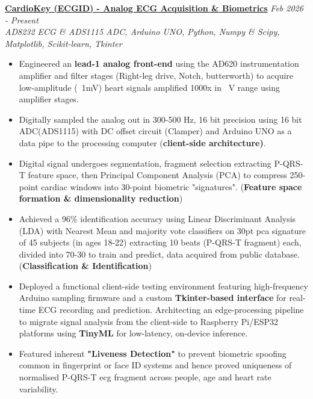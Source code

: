 \documentclass[a4paper]{article}
\begin{document}
\href{https://github.com/aaromalonline/cardiokey}{\textbf{CardioKey (ECGID) - Analog ECG Acquisition \& Biometrics}} \hfill \textit{Feb 2026 - Present}\\
{\sl AD8232 ECG \& ADS1115 ADC, Arduino UNO, Python, Numpy \& Scipy, Matplotlib, Scikit-learn, Tkinter}
\begin{itemize} \itemsep 1pt
    \item Engineered an \textbf{lead-1 analog front-end} using the AD620 instrumentation amplifier and filter stages (Right-leg drive, Notch, butterworth) to acquire low-amplitude (~1mV) heart signals amplified 1000x in ~V range using amplifier stages.
    \item Digitally sampled the analog out in 300-500 Hz, 16 bit precision using 16 bit ADC(ADS1115) with DC offset circuit (Clamper) and Arduino UNO as a data pipe to the processing computer (\textbf{client-side architecture)}.
    \item Digital signal undergoes segmentation, fragment selection extracting P-QRS-T feature space, then Principal Component Analysis (PCA) to compress 250-point cardiac windows into 30-point biometric "signatures". (\textbf{Feature space formation \& dimensionality reduction})
    \item Achieved a 96\% identification accuracy using Linear Discriminant Analysis (LDA) with Nearest Mean and majority vote classifiers on 30pt pca signature of 45 subjects (in ages 18-22) extracting 10 beats (P-QRS-T fragment) each, divided into 70-30 to train and predict, data acquired from public database. (\textbf{Classification \& Identification})
    \item Deployed a functional client-side testing environment featuring high-frequency Arduino sampling firmware and a custom \textbf{Tkinter-based interface} for real-time ECG recording and prediction. Architecting an edge-processing pipeline to migrate signal analysis from the client-side to Raspberry Pi/ESP32 platforms using \textbf{TinyML} for low-latency, on-device inference.
    \item Featured inherent \textbf{"Liveness Detection"} to prevent biometric spoofing common in fingerprint or face ID systems and hence proved uniqueness of normalised P-QRS-T ecg fragment across people, age and heart rate variability.
\end{itemize}
\vspace*{2mm}
\end{document}
